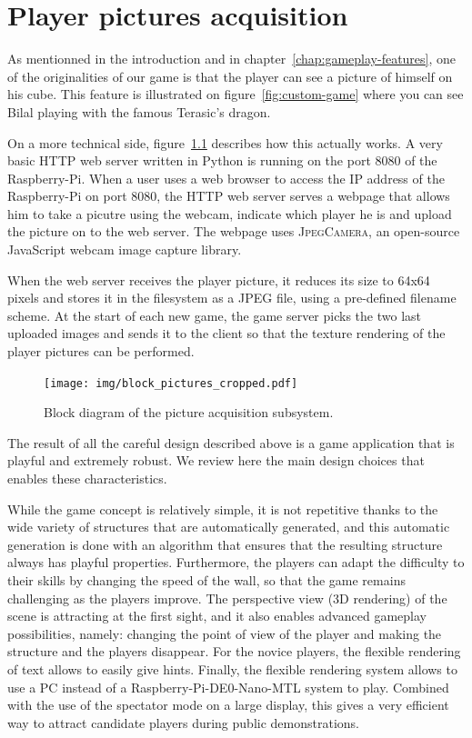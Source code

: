 \documentclass[english, DIV=13]{scrreprt}
\begin{document}
\chapter{Player pictures acquisition}
\label{chap:pic-acq}

As mentionned in the introduction and in chapter~\ref{chap:gameplay-features},
one of the originalities of our game is that the player can see a picture of
himself on his cube. This feature is illustrated on
figure~\ref{fig:custom-game} where you can see Bilal playing with the famous
Terasic's dragon.

On a more technical side, figure~\ref{fig:pic-acq} describes how this actually
works. A very basic HTTP web server written in Python is running on the port 8080
of the Raspberry-Pi. When a user uses a web browser to access the IP address
of the Raspberry-Pi on port 8080, the HTTP web server serves a webpage 
that allows him to take a picutre using the webcam, indicate which player he is
and upload the picture on to the web server. The webpage uses \textsc{JpegCamera},
an open-source JavaScript webcam image capture library.

When the web server receives the player picture, it reduces its size to 64x64 pixels
and stores it in the filesystem as a JPEG file, using a pre-defined filename scheme.
At the start of each new game, the game server picks the two last uploaded images and
sends it to the client so that the texture rendering of the player pictures can be
performed.

\begin{figure}[bth]
    \centering
    \texttt{[image: img/block\_pictures\_cropped.pdf]}
    \caption{Block diagram of the picture acquisition subsystem.}
    \label{fig:pic-acq}
\end{figure}


The result of all the careful design described above is a game application that
is playful and extremely robust. We review here the main design choices that
enables these characteristics.

While the game concept is relatively simple, it is not repetitive thanks to the
wide variety of structures that are automatically generated, and this automatic
generation is done with an algorithm that ensures that the resulting structure
always has playful properties. Furthermore, the players can adapt the
difficulty to their skills by changing the speed of the wall, so that the game
remains challenging as the players improve. The perspective view (3D rendering)
of the scene is attracting at the first sight, and it also enables
advanced gameplay possibilities, namely: changing the point of view of the
player and making the structure and the players disappear. For the novice
players, the flexible rendering of text allows to easily give hints. Finally,
the flexible rendering system allows to use a PC instead of a
Raspberry-Pi-DE0-Nano-MTL system to play. Combined with the use of the spectator
mode on a large display, this gives a very efficient way to attract candidate players
during public demonstrations.
\end{document}
